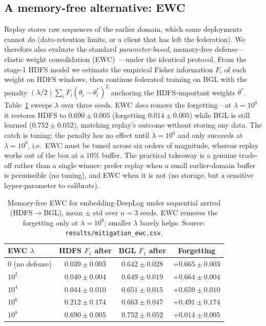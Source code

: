 \documentclass[journal]{IEEEtran}
\begin{document}
\subsection{A memory-free alternative: EWC}\label{sec:ewc}
Replay stores raw sequences of the earlier domain, which some deployments cannot do (data-retention
limits, or a client that has left the federation). We therefore also evaluate the standard
\emph{parameter-based}, memory-free defense---elastic weight consolidation
(EWC)~\cite{kirkpatrick2017overcoming}---under the identical protocol. From the stage-1 HDFS model we
estimate the empirical Fisher information $F_i$ of each weight on HDFS windows, then continue federated
training on BGL with the penalty $(\lambda/2)\sum_i F_i(\theta_i-\theta_i^\ast)^2$ anchoring the
HDFS-important weights $\theta^\ast$. Table~\ref{tab:ewc} sweeps $\lambda$ over three seeds. EWC
\emph{does} remove the forgetting---at $\lambda{=}10^{8}$ it restores HDFS to $0.690\pm0.005$
(forgetting $0.014\pm0.005$) while BGL is still learned ($0.752\pm0.052$), matching replay's outcome
without storing any data. The catch is tuning: the penalty has no effect until $\lambda{=}10^{6}$ and
only succeeds at $\lambda{=}10^{8}$, i.e.\ EWC must be tuned across six orders of magnitude, whereas
replay works out of the box at a $10\%$ buffer. The practical takeaway is a genuine trade-off rather
than a single winner: prefer replay when a small earlier-domain buffer is permissible (no tuning),
and EWC when it is not (no storage, but a sensitive hyper-parameter to calibrate).

\begin{table}[t]
\caption{Memory-free EWC for embedding-DeepLog under sequential arrival (HDFS$\rightarrow$BGL),
mean $\pm$ std over $n=3$ seeds. EWC removes the forgetting only at $\lambda{=}10^{8}$; smaller
$\lambda$ barely helps. Source: \texttt{results/mitigation\_ewc.csv}.}
\label{tab:ewc}
\centering
\begin{tabular}{@{}lccc@{}}
\toprule
EWC $\lambda$ & HDFS $F_1$ after & BGL $F_1$ after & Forgetting \\
\midrule
$0$ (no defense) & $0.039\pm0.003$ & $0.642\pm0.028$ & $+0.665\pm0.003$ \\
$10^{2}$         & $0.040\pm0.004$ & $0.649\pm0.019$ & $+0.664\pm0.004$ \\
$10^{4}$         & $0.044\pm0.010$ & $0.651\pm0.015$ & $+0.659\pm0.010$ \\
$10^{6}$         & $0.212\pm0.174$ & $0.663\pm0.047$ & $+0.491\pm0.174$ \\
$10^{8}$         & $\mathbf{0.690\pm0.005}$ & $0.752\pm0.052$ & $\mathbf{+0.014\pm0.005}$ \\
\bottomrule
\end{tabular}
\end{table}
\end{document}
